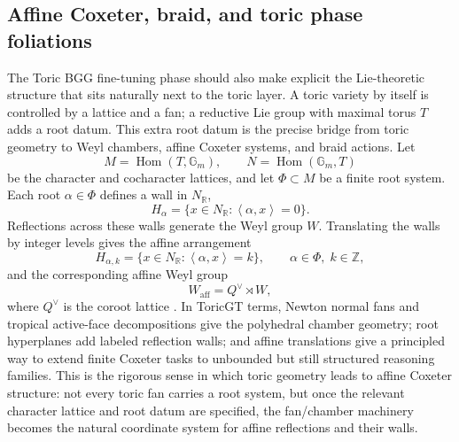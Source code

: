 \documentclass[11pt]{article}
\theoremstyle{definition}
\theoremstyle{plain}
\theoremstyle{remark}
\numberwithin{equation}{section}
\newcommand{\R}{\mathbb{R}}
\newcommand{\Z}{\mathbb{Z}}
\newcommand{\ip}[2]{\left\langle #1,#2\right\rangle}
\begin{document}
\subsection{Affine Coxeter, braid, and toric phase foliations}

The Toric BGG fine-tuning phase should also make explicit the Lie-theoretic structure that sits naturally next to the toric layer.  A toric variety by itself is controlled by a lattice and a fan; a reductive Lie group with maximal torus $T$ adds a root datum.  This extra root datum is the precise bridge from toric geometry to Weyl chambers, affine Coxeter systems, and braid actions.  Let
\begin{equation}
  M=\operatorname{Hom}(T,\mathbb G_m),\qquad
  N=\operatorname{Hom}(\mathbb G_m,T)
\end{equation}
be the character and cocharacter lattices, and let $\Phi\subset M$ be a finite root system.  Each root $\alpha\in\Phi$ defines a wall in $N_\R$,
\begin{equation}
  H_\alpha=\{x\in N_\R:\ip{\alpha}{x}=0\}.
\end{equation}
Reflections across these walls generate the Weyl group $W$.  Translating the walls by integer levels gives the affine arrangement
\begin{equation}
  H_{\alpha,k}=\{x\in N_\R:\ip{\alpha}{x}=k\},\qquad \alpha\in\Phi,\;k\in\Z,
\end{equation}
and the corresponding affine Weyl group
\begin{equation}
  W_{\mathrm{aff}}=Q^\vee\rtimes W,
\end{equation}
where $Q^\vee$ is the coroot lattice \cite{humphreys1990reflection}.  In ToricGT terms, Newton normal fans and tropical active-face decompositions give the polyhedral chamber geometry; root hyperplanes add labeled reflection walls; and affine translations give a principled way to extend finite Coxeter tasks to unbounded but still structured reasoning families.  This is the rigorous sense in which toric geometry leads to affine Coxeter structure: not every toric fan carries a root system, but once the relevant character lattice and root datum are specified, the fan/chamber machinery becomes the natural coordinate system for affine reflections and their walls.
\end{document}
